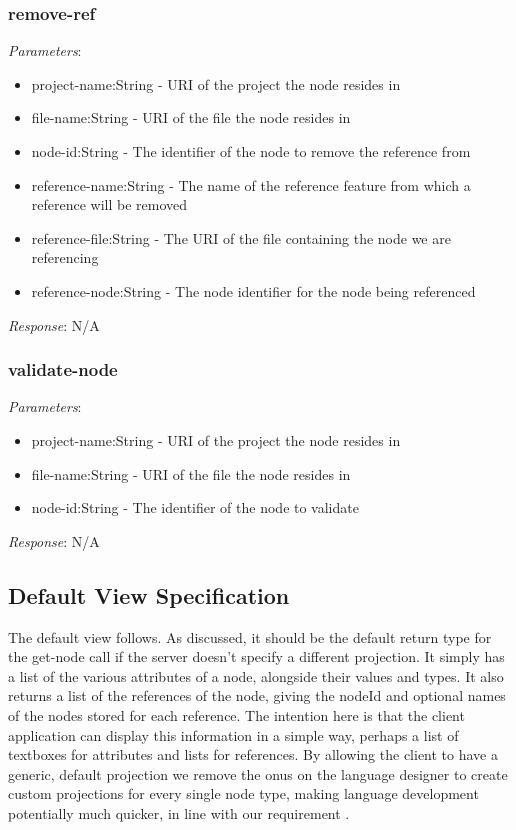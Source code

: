\documentclass{report}
\begin{document}
\subsubsection{remove-ref}
\emph{Parameters}: 
\begin{itemize}
\item project-name:String - URI of the project the node resides in
\item file-name:String - URI of the file the node resides in
\item node-id:String - The identifier of the node to remove the reference from
\item reference-name:String - The name of the reference feature from which a reference will be removed
\item reference-file:String - The URI of the file containing the node we are referencing
\item reference-node:String - The node identifier for the node being referenced
\end{itemize}
\emph{Response}: N/A

\subsubsection{validate-node}

\emph{Parameters}: 
\begin{itemize}
\item project-name:String - URI of the project the node resides in
\item file-name:String - URI of the file the node resides in
\item node-id:String - The identifier of the node to validate
\end{itemize}
\emph{Response}: N/A

\subsection{Default View Specification}
The default view follows. As discussed, it should be the default return type for the get-node call if the server doesn't specify a different projection. It simply has a list of the various attributes of a node, alongside their values and types. It also returns a list of the references of the node, giving the nodeId and optional names of the nodes stored for each reference. The intention here is that the client application can display this information in a simple way, perhaps a list of textboxes for attributes and lists for references. By allowing the client to have a generic, default projection we remove the onus on the language designer to create custom projections for every single node type, making language development potentially much quicker, in line with our requirement \RSetup.

\end{document}
